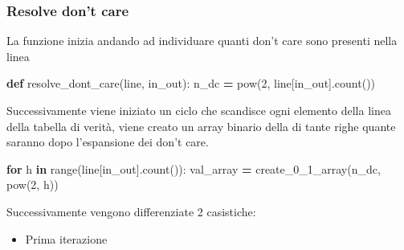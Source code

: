 \documentclass[
  italian,
]{book}
\newenvironment{Shaded}{\begin{snugshade}}{\end{snugshade}}
\newcommand{\BuiltInTok}[1]{#1}
\newcommand{\ControlFlowTok}[1]{\textcolor[rgb]{0.13,0.29,0.53}{\textbf{#1}}}
\newcommand{\DecValTok}[1]{\textcolor[rgb]{0.00,0.00,0.81}{#1}}
\newcommand{\KeywordTok}[1]{\textcolor[rgb]{0.13,0.29,0.53}{\textbf{#1}}}
\newcommand{\NormalTok}[1]{#1}
\newcommand{\OperatorTok}[1]{\textcolor[rgb]{0.81,0.36,0.00}{\textbf{#1}}}
\newcommand{\StringTok}[1]{\textcolor[rgb]{0.31,0.60,0.02}{#1}}
\providecommand{\tightlist}{%
  \setlength{\itemsep}{0pt}\setlength{\parskip}{0pt}}
\begin{document}
\hypertarget{resolve-dont-care}{%
\subsubsection{Resolve don't care}\label{resolve-dont-care}}

La funzione inizia andando ad individuare quanti don't care sono presenti nella linea

\begin{Shaded}
\begin{Highlighting}[]
\KeywordTok{def}\NormalTok{ resolve\_dont\_care(line, in\_out):}
\NormalTok{  n\_dc }\OperatorTok{=} \BuiltInTok{pow}\NormalTok{(}\DecValTok{2}\NormalTok{, line[in\_out].count(}\StringTok{\textquotesingle{}{-}\textquotesingle{}}\NormalTok{))}
\end{Highlighting}
\end{Shaded}

\newpage

Successivamente viene iniziato un ciclo che scandisce ogni elemento della linea della tabella di verità, viene creato un array binario della di tante righe quante saranno dopo l'espansione dei don't care.

\begin{Shaded}
\begin{Highlighting}[]
\ControlFlowTok{for}\NormalTok{ h }\KeywordTok{in} \BuiltInTok{range}\NormalTok{(line[in\_out].count(}\StringTok{\textquotesingle{}{-}\textquotesingle{}}\NormalTok{)):}
\NormalTok{  val\_array }\OperatorTok{=}\NormalTok{ create\_0\_1\_array(n\_dc, }\BuiltInTok{pow}\NormalTok{(}\DecValTok{2}\NormalTok{, h))}
\end{Highlighting}
\end{Shaded}

Successivamente vengono differenziate 2 casistiche:

\begin{itemize}
\tightlist
\item
  Prima iterazione
\end{itemize}
\end{document}
